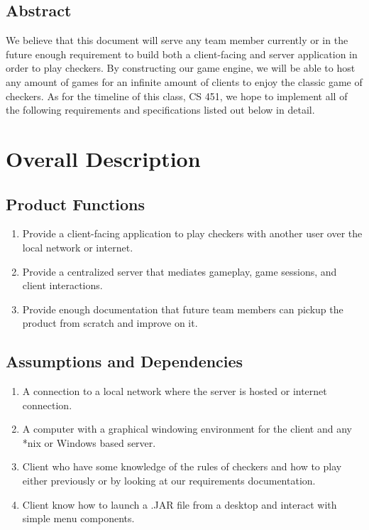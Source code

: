 \documentclass{scrreprt}
\begin{document}
\section{Abstract}

We believe that this document will serve any team member currently or in the future enough requirement to build both a client-facing and server application in order to play checkers.
By constructing our game engine, we will be able to host any amount of games for an infinite amount of clients to enjoy the classic game of checkers. As for the timeline of this class, CS 451, we hope to implement all of the following requirements and specifications listed out below in detail. 

\chapter{Overall Description}

\section{Product Functions}

\begin{enumerate}
    \item Provide a client-facing application to play checkers with another user over the local network or internet.
    \item Provide a centralized server that mediates gameplay, game sessions, and client interactions.
    \item Provide enough documentation that future team members can pickup the product from scratch and improve on it.
\end{enumerate}

\section{Assumptions and Dependencies}

\begin{enumerate}
    \item A connection to a local network where the server is hosted or internet connection.
    \item A computer with a graphical windowing environment for the client and any *nix or Windows based server.
    \item Client who have some knowledge of the rules of checkers and how to play either previously or by looking at our requirements documentation.
    \item Client know how to launch a .JAR file from a desktop and interact with simple menu components.
\end{enumerate}
\end{document}
